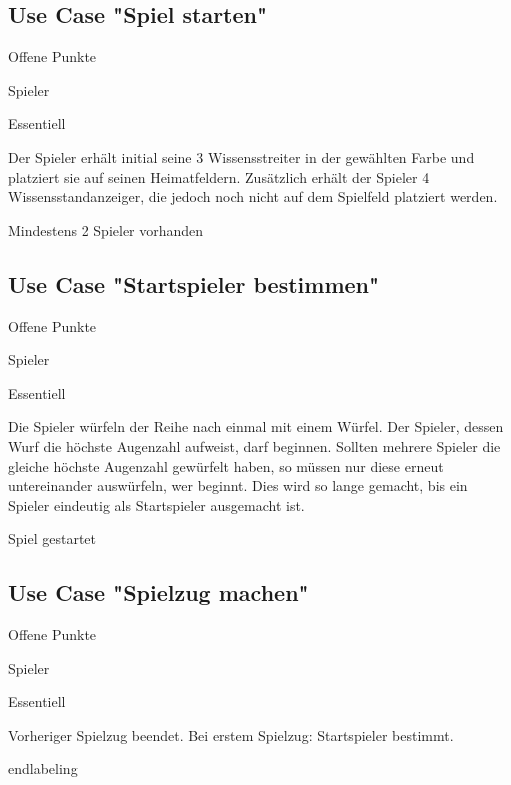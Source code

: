 \subsection{Use Case "Spiel starten"}
\begin{labeling}[:]{Offene Punkte}
\item [Akteure] Spieler
\item [Priorität] Essentiell
\item [Beschreibung] Der Spieler erhält initial seine 3 Wissensstreiter in der gewählten Farbe und platziert sie auf seinen Heimatfeldern. Zusätzlich erhält der Spieler 4 Wissensstandanzeiger, die jedoch noch nicht auf dem Spielfeld platziert werden.
\item [Vorbedigungen] Mindestens 2 Spieler vorhanden
\item [Offene Punkte]

\subsection{Use Case "Startspieler bestimmen"}
\begin{labeling}[:]{Offene Punkte}
\item [Akteure] Spieler
\item [Priorität] Essentiell
\item [Beschreibung] Die Spieler würfeln der Reihe nach einmal mit einem Würfel. Der Spieler, dessen Wurf die höchste Augenzahl aufweist, darf beginnen. Sollten mehrere Spieler die gleiche höchste Augenzahl gewürfelt haben, so müssen nur diese erneut untereinander auswürfeln, wer beginnt. Dies wird so lange gemacht, bis ein Spieler eindeutig als Startspieler ausgemacht ist.
\item [Vorbedigungen] Spiel gestartet
\item [Offene Punkte]

\subsection{Use Case "Spielzug machen"}
\begin{labeling}[:]{Offene Punkte}
\item [Akteure] Spieler
\item [Priorität] Essentiell
\item [Beschreibung] 
\item [Vorbedigungen] Vorheriger Spielzug beendet. Bei erstem Spielzug: Startspieler bestimmt.
\item [Offene Punkte]
\end{labeling}end{labeling}


\end{labeling}
\end{labeling}
